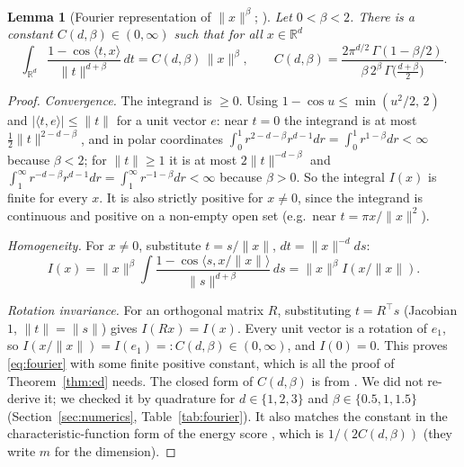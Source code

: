 \documentclass[11pt]{article}
\newtheorem{lemma}[theorem]{Lemma}
\theoremstyle{definition}
\theoremstyle{remark}
\newcommand{\R}{\mathbb{R}}
\newcommand{\norm}[1]{\lVert #1\rVert}
\newcommand{\ip}[2]{\langle #1, #2\rangle}
\begin{document}
\begin{lemma}[Fourier representation of $\norm{x}^\beta$; {\cite[Lemma~1, eq.~(5.2)]{SR2013}}]\label{lem:fourier}
Let $0<\beta<2$. There is a constant $C(d,\beta)\in(0,\infty)$ such that for all $x\in\R^d$
\begin{equation}\label{eq:fourier}
\int_{\R^d}\frac{1-\cos\ip{t}{x}}{\norm{t}^{d+\beta}}\,dt=C(d,\beta)\,\norm{x}^\beta,
\qquad C(d,\beta)=\frac{2\pi^{d/2}\,\Gamma(1-\beta/2)}{\beta\,2^\beta\,\Gamma\!\big(\frac{d+\beta}{2}\big)}.
\end{equation}
\end{lemma}
\begin{proof}
\emph{Convergence.} The integrand is $\ge0$. Using $1-\cos u\le\min(u^2/2,\,2)$ and
$|\ip{t}{e}|\le\norm{t}$ for a unit vector $e$: near $t=0$ the integrand is at most
$\tfrac12\norm{t}^{2-d-\beta}$, and in polar coordinates $\int_0^1 r^{2-d-\beta}r^{d-1}dr=\int_0^1r^{1-\beta}dr<\infty$
because $\beta<2$; for $\norm{t}\ge1$ it is at most $2\norm{t}^{-d-\beta}$ and
$\int_1^\infty r^{-d-\beta}r^{d-1}dr=\int_1^\infty r^{-1-\beta}dr<\infty$ because $\beta>0$. So the integral
$I(x)$ is finite for every $x$. It is also strictly positive for $x\neq0$, since the integrand is continuous and
positive on a non-empty open set (e.g.\ near $t=\pi x/\norm{x}^2$).

\emph{Homogeneity.} For $x\neq0$, substitute $t=s/\norm{x}$, $dt=\norm{x}^{-d}ds$:
\[
I(x)=\norm{x}^{\beta}\int\frac{1-\cos\ip{s}{x/\norm{x}}}{\norm{s}^{d+\beta}}\,ds=\norm{x}^\beta I(x/\norm{x}).
\]

\emph{Rotation invariance.} For an orthogonal matrix $R$, substituting $t=R^\top s$ (Jacobian $1$,
$\norm{t}=\norm{s}$) gives $I(Rx)=I(x)$. Every unit vector is a rotation of $e_1$, so
$I(x/\norm{x})=I(e_1)=:C(d,\beta)\in(0,\infty)$, and $I(0)=0$. This proves \eqref{eq:fourier} with some
finite positive constant, which is all the proof of Theorem~\ref{thm:ed} needs. The closed form of
$C(d,\beta)$ is from \cite[eq.~(5.2), Appendix~A]{SR2013}. We did not re-derive it; we checked it by
quadrature for $d\in\{1,2,3\}$ and $\beta\in\{0.5,1,1.5\}$ (Section~\ref{sec:numerics}, Table~\ref{tab:fourier}).
It also matches the constant in the characteristic-function form of the energy score \cite[eq.~(24)]{GR2007},
which is $1/(2C(d,\beta))$ (they write $m$ for the dimension).
\end{proof}
\end{document}
